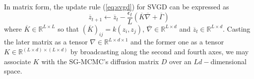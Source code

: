 In matrix form, the update rule (\ref{eq:svgd}) for SVGD can be expressed as
\begin{equation}\label{eq:svgd_mat}
\overline{{z}}_{t+1} \leftarrow \overline{{z}}_t -\frac{\epsilon_t}{L}\left( \overline{{K}} \overline{{\nabla}} + \overline{{\Gamma}} \right)
\end{equation}
where $\overline{{K}} \in \mathbb{R}^{L \times L}$ so that $(\overline{{K}})_{ij} = k({z}_i, {z}_j)$, $\overline{{\nabla}} \in \mathbb{R}^{L\times d}$ and $\overline{{z}}_t \in \mathbb{R}^{L\times d}$. Casting the later matrix as a tensor ${\nabla} \in \mathbb{R}^{L \times d \times 1}$ and the former one as a tensor ${K} \in \mathbb{R}^{(L \times d) \times (L \times d)}$ by broadcasting along the second and fourth axes, we may associate ${K}$ with the SG-MCMC's diffusion matrix ${D}$ over an $Ld-$dimensional space. 

